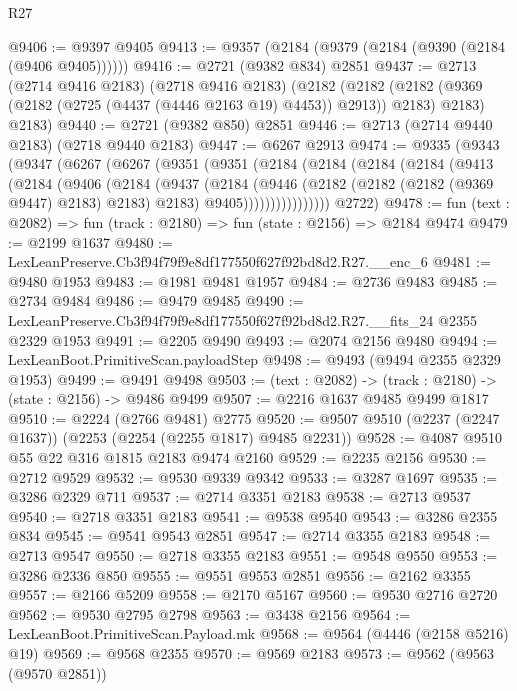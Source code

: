 \begin{lexlean}{R27}
\begin{coremodule}
@9406 := @9397 @9405
@9413 := @9357 (@2184 (@9379 (@2184 (@9390 (@2184 (@9406 @9405))))))
@9416 := @2721 (@9382 @834) @2851
@9437 := @2713
    (@2714 @9416 @2183)
    (@2718 @9416 @2183)
    (@2182
      (@2182 (@2182 (@9369 (@2182 (@2725 (@4437 (@4446 @2163 @19) @4453)) @2913)) @2183) @2183)
      @2183)
@9440 := @2721 (@9382 @850) @2851
@9446 := @2713 (@2714 @9440 @2183) (@2718 @9440 @2183)
@9447 := @6267 @2913
@9474 := @9335
    (@9343
      (@9347
        (@6267
          (@6267
            (@9351
              (@9351
                (@2184
                  (@2184
                    (@2184
                      (@2184
                        (@9413
                          (@2184
                            (@9406
                              (@2184
                                (@9437
                                  (@2184
                                    (@9446
                                      (@2182 (@2182 (@2182 (@9369 @9447) @2183) @2183) @2183)
                                      @9405))))))))))))))))
      @2722)
@9478 := fun (text : @2082) => fun (track : @2180) => fun (state : @2156) => @2184 @9474
@9479 := @2199 @1637
@9480 := LexLeanPreserve.Cb3f94f79f9e8df177550f627f92bd8d2.R27.__enc_6
@9481 := @9480 @1953
@9483 := @1981 @9481 @1957
@9484 := @2736 @9483
@9485 := @2734 @9484
@9486 := @9479 @9485
@9490 := LexLeanPreserve.Cb3f94f79f9e8df177550f627f92bd8d2.R27.__fits_24 @2355 @2329 @1953
@9491 := @2205 @9490
@9493 := @2074 @2156 @9480
@9494 := LexLeanBoot.PrimitiveScan.payloadStep
@9498 := @9493 (@9494 @2355 @2329 @1953)
@9499 := @9491 @9498
@9503 := (text : @2082) -> (track : @2180) -> (state : @2156) -> @9486 @9499
@9507 := @2216 @1637 @9485 @9499 @1817
@9510 := @2224 (@2766 @9481) @2775
@9520 := @9507 @9510 (@2237 (@2247 @1637)) (@2253 (@2254 (@2255 @1817) @9485 @2231))
@9528 := @4087 @9510 @55 @22 @316 @1815 @2183 @9474 @2160
@9529 := @2235 @2156
@9530 := @2712 @9529
@9532 := @9530 @9339 @9342
@9533 := @3287 @1697
@9535 := @3286 @2329 @711
@9537 := @2714 @3351 @2183
@9538 := @2713 @9537
@9540 := @2718 @3351 @2183
@9541 := @9538 @9540
@9543 := @3286 @2355 @834
@9545 := @9541 @9543 @2851
@9547 := @2714 @3355 @2183
@9548 := @2713 @9547
@9550 := @2718 @3355 @2183
@9551 := @9548 @9550
@9553 := @3286 @2336 @850
@9555 := @9551 @9553 @2851
@9556 := @2162 @3355
@9557 := @2166 @5209
@9558 := @2170 @5167
@9560 := @9530 @2716 @2720
@9562 := @9530 @2795 @2798
@9563 := @3438 @2156
@9564 := LexLeanBoot.PrimitiveScan.Payload.mk
@9568 := @9564 (@4446 (@2158 @5216) @19)
@9569 := @9568 @2355
@9570 := @9569 @2183
@9573 := @9562 (@9563 (@9570 @2851))

\end{coremodule}
\end{lexlean}
